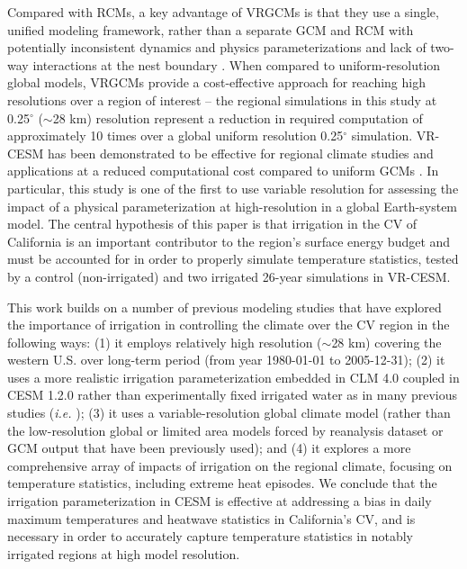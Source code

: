 \documentclass[draft,ms]{agutex}   %
\begin{document}
\begin{article}
Compared with RCMs, a key advantage of VRGCMs is that they use a single, unified modeling framework, rather than a separate GCM and RCM with potentially inconsistent dynamics and physics parameterizations and lack of two-way interactions at the nest boundary \citep{laprise2008challenging}. When compared to uniform-resolution global models, VRGCMs provide a cost-effective approach for reaching high resolutions over a region of interest -- the regional simulations in this study at 0.25$^\circ$ ($\sim$28 km) resolution represent a reduction in required computation of approximately 10 times over a global uniform resolution 0.25$^\circ$ simulation. VR-CESM has been demonstrated to be effective for regional climate studies and applications at a reduced computational cost compared to uniform GCMs \citep{zarzycki2015effects, rhoades2015characterizing, huang2016evaluation}. In particular, this study is one of the first to use variable resolution for assessing the impact of a physical parameterization at high-resolution in a global Earth-system model. The central hypothesis of this paper is that irrigation in the CV of California is an important contributor to the region's surface energy budget and must be accounted for in order to properly simulate temperature statistics, tested by a control (non-irrigated) and two irrigated 26-year simulations in VR-CESM.

This work builds on a number of previous modeling studies that have explored the importance of irrigation in controlling the climate over the CV region in the following ways: (1) it employs relatively high resolution ($\sim$28 km) covering the western U.S. over long-term period  (from year 1980-01-01 to 2005-12-31); (2) it uses a more realistic irrigation parameterization embedded in CLM 4.0 coupled in CESM 1.2.0 rather than experimentally fixed irrigated water as in many previous studies (\textit{i.e.} \cite{lobell2006biogeophysical, lo2013irrigation}); (3) it uses a variable-resolution global climate model (rather than the low-resolution global or limited area models forced by reanalysis dataset or GCM output that have been previously used); and (4) it explores a more comprehensive array of impacts of irrigation on the regional climate, focusing on temperature statistics, including extreme heat episodes.  We conclude that the irrigation parameterization in CESM is effective at addressing a bias in daily maximum temperatures and heatwave statistics in California's CV, and is necessary in order to accurately capture temperature statistics in notably irrigated regions at high model resolution.


\end{article}
\end{document}
